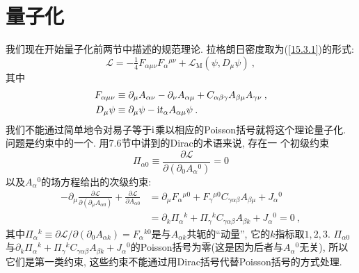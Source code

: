 \section{量子化}
我们现在开始量子化前两节中描述的规范理论. 拉格朗日密度取为(\ref{15.3.1})的形式:
\begin{equation}
 \mathscr{L} = -\tfrac{1}{4} F_{\alpha\mu\nu}F_{\alpha}{}^{\mu\nu}+\mathscr{L}_{\mathrm{M}}(\psi,D_{\mu}\psi) \:,  \label{15.4.1}
\end{equation}
其中
\begin{align*}
 F_{\alpha\mu\nu} & \equiv \partial_{\mu} A_{\alpha\nu} -\partial_{\nu}A_{\alpha\mu} + C_{\alpha \beta \gamma} A_{\beta\mu}A_{\gamma\nu} \:,  \\
     D_{\mu}\psi  & \equiv \partial_{\mu} \psi - \mathrm{i} t_{\alpha} A_{\alpha\mu}\psi \:. 
\end{align*}
我们不能通过简单地令对易子等于$\mathrm{i}$乘以相应的Poisson括号就将这个理论量子化. 问题是约束中的一个. 用7.6节中讲到的Dirac的术语来说, 存在一%
个初级约束\begin{equation}
\Pi _{\alpha 0}\equiv \frac{\partial \mathscr{L}}{\partial (\partial
_{0}A_{\alpha }{}^{0})}=0  \label{15.4.2}
\end{equation}%
以及$A_{\alpha }{}^{0}$的场方程给出的次级约束:%
\begin{align}
-\partial _{\mu }\frac{\partial \mathscr{L}}{\partial (\partial _{\mu
}A_{\alpha 0})}+\frac{\partial \mathscr{L}}{\partial A_{\alpha 0}}
&=\partial _{\mu }F_{\alpha }{}^{\mu 0}+F_{\gamma }{}^{\mu 0}C_{\gamma
\alpha \beta }A_{\beta \mu }+J_{\alpha }{}^{0}  \nonumber \\
&=\partial _{k}\Pi _{\alpha }{}^{k}+\Pi _{\gamma }{}^{k}C_{\gamma \alpha\beta }A_{\beta k}+J_{\alpha }{}^{0}=0\:,   \label{15.4.3}
\end{align}%
其中$\Pi _{\alpha }{}^{k}\equiv \partial \mathscr{L}/\partial
(\partial _{0}A_{\alpha k})=F_{\alpha }{}^{k0}$是与$A_{\alpha k}$共轭的``动量'', 它的$k$指标取$1,2,3$. 
$\Pi _{\alpha 0}$与$\partial_{k}\Pi_{\alpha}{}^{k}+\Pi_{\gamma }{}^{k}C_{\gamma \alpha \beta }A_{\beta k}+J_{\alpha
}{}^{0}$的Poisson括号为零(这是因为后者与$A_{\alpha }{}^{0}$无关), 所以它们是第一类约束, 这些约束不能通过用Dirac括号代替Poisson括号的方式处理.

